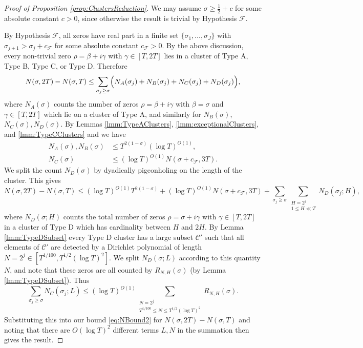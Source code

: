\documentclass[12pt]{amsart}
\theoremstyle{plain}
\theoremstyle{definition}
\theoremstyle{remark}
\begin{document}
\begin{proof}[Proof of Proposition \ref{prop:ClustersReduction}]
We may assume $\sigma \geq \frac{1}{2} + c$ for some absolute constant $c>0$, since otherwise the result is trivial by Hypothesis $\mathcal{F}$.

By Hypothesis $\mathcal{F}$, all zeros have real part in a finite set $\{\sigma_1,\dots,\sigma_J\}$ with $\sigma_{j+1}>\sigma_j+c_{\mathcal{F}}$ for some  absolute constant $c_{\mathcal{F}}>0$. By the above discussion, every non-trivial zero $\rho=\beta+i\gamma$ with $\gamma\in[T,2T]$ lies in a cluster of Type A, Type B, Type C, or Type D. Therefore
\[
N(\sigma,2T)-N(\sigma,T)\le \sum_{\sigma_j\ge \sigma}\Bigl(N_A(\sigma_j)+N_B(\sigma_j)+N_C(\sigma_j) + N_D(\sigma_j)\Bigr),
\]
where $N_A(\sigma)$ counts the number of zeros $\rho=\beta+i\gamma$ with $\beta=\sigma$ and $\gamma\in[T,2T]$ which lie on a cluster of Type A, and similarly for $N_B(\sigma)$, $N_C(\sigma),N_D(\sigma)$. By Lemmas \ref{lmm:TypeAClusters}, \ref{lmm:exceptionalClusters}, and \ref{lmm:TypeCClusters} and we have 
\begin{align*}
N_A(\sigma),N_B(\sigma)&\le T^{2(1-\sigma)}(\log{T})^{O(1)},\\
N_C(\sigma)&\le (\log{T})^{O(1)}N(\sigma+c_{\mathcal{F}},3T).
\end{align*}
 We split the count $N_D(\sigma)$ by dyadically pigeonholing on the length of the cluster. This gives
 \begin{equation}
 N(\sigma,2T)-N(\sigma,T)\le (\log{T})^{O(1)}T^{2(1-\sigma)}+(\log{T})^{O(1)}N(\sigma+c_{\mathcal{F}},3T)+\sum_{\sigma_j\ge \sigma}\sum_{\substack{H=2^j\\ 1\leq H\ll T}}N_{D}(\sigma_j;H),
 \label{eq:NBound2}
 \end{equation}
 where $N_{D}(\sigma;H)$ counts the total number of zeros $\rho=\sigma+i\gamma$ with $\gamma\in[T,2T]$ in a cluster of Type D which has cardinality between $H$ and $2H$. By Lemma \ref{lmm:TypeDSubset} every Type D cluster has a large subset $\mathcal{C}'$ such that all elements of $\mathcal{C}'$ are detected by a Dirichlet polynomial of length $N=2^j\in [T^{1/100},T^{1/2}(\log{T})^2]$. We split $N_{D}(\sigma;L)$ according to this quantity $N$, and note that these zeros are all counted by $R_{N,H}(\sigma)$ (by Lemma \ref{lmm:TypeDSubset}). Thus
 \[
 \sum_{\sigma_j\ge \sigma}N_{C}(\sigma_j;L)\le (\log T)^{O(1)} \sum_{\substack{N=2^j\\ T^{1/100}\le N\le T^{1/2}(\log{T})^2}}R_{N,H}(\sigma).
 \]
 Substituting this into our bound \eqref{eq:NBound2} for $N(\sigma,2T)-N(\sigma,T)$ and noting that there are $O(\log{T})^2$ different terms $L,N$ in the summation then gives the result. 
\end{proof}
%
%
%
%
\end{document}
